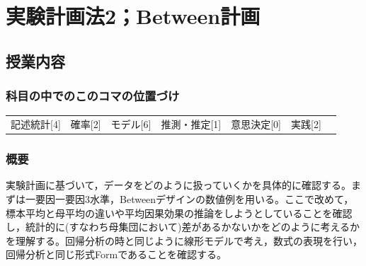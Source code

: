 \section{実験計画法2；Between計画}
\label{D1_lesson13}

\subsection{授業内容}
\subsubsection{科目の中でのこのコマの位置づけ}
\begin{tabular}[t]{ccccccc}
    記述統計[4] & 確率[2] & モデル[6] & 推測・推定[1] & 意思決定[0] & 実践[2]
\end{tabular}
\subsubsection{概要}
実験計画に基づいて，データをどのように扱っていくかを具体的に確認する。まずは一要因一要因3水準，Betweenデザインの数値例を用いる。ここで改めて，標本平均と母平均の違いや平均因果効果の推論をしようとしていることを確認し，統計的に(すなわち母集団において)差があるかないかをどのように考えるかを理解する。回帰分析の時と同じように線形モデルで考え，数式の表現を行い，回帰分析と同じ形式Formであることを確認する。
